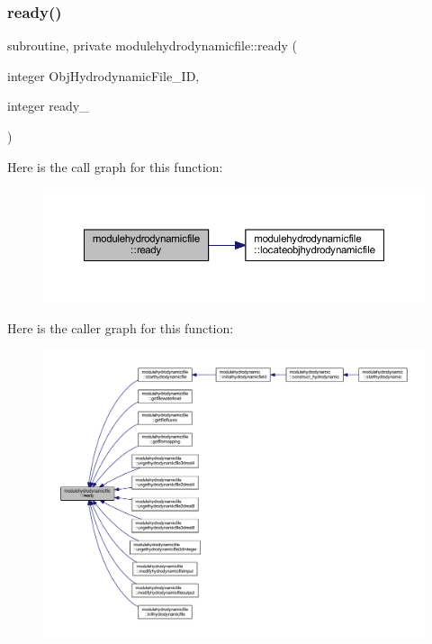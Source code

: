 \subsubsection{\texorpdfstring{ready()}{ready()}}
{\footnotesize\ttfamily subroutine, private modulehydrodynamicfile\+::ready (\begin{DoxyParamCaption}\item[{integer}]{Obj\+Hydrodynamic\+File\+\_\+\+ID,  }\item[{integer}]{ready\+\_\+ }\end{DoxyParamCaption})\hspace{0.3cm}{\ttfamily [private]}}

Here is the call graph for this function\+:\nopagebreak
\begin{figure}[H]
\begin{center}
\leavevmode
\includegraphics[width=350pt]{namespacemodulehydrodynamicfile_ab74a3df233aec6594db3ce069b1a2c25_cgraph}
\end{center}
\end{figure}
Here is the caller graph for this function\+:\nopagebreak
\begin{figure}[H]
\begin{center}
\leavevmode
\includegraphics[width=350pt]{namespacemodulehydrodynamicfile_ab74a3df233aec6594db3ce069b1a2c25_icgraph}
\end{center}
\end{figure}
\mbox{\label{namespacemodulehydrodynamicfile_a45b05c777eb42ae5c5d23981ba6256da}} 
